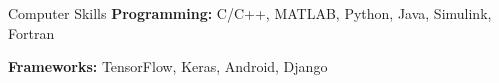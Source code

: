 \begin{rSection}{Computer Skills}
{\bf Programming:} C/C++, MATLAB, Python, Java, Simulink, Fortran

{\bf Frameworks:} TensorFlow, Keras, Android, Django

\end{rSection}